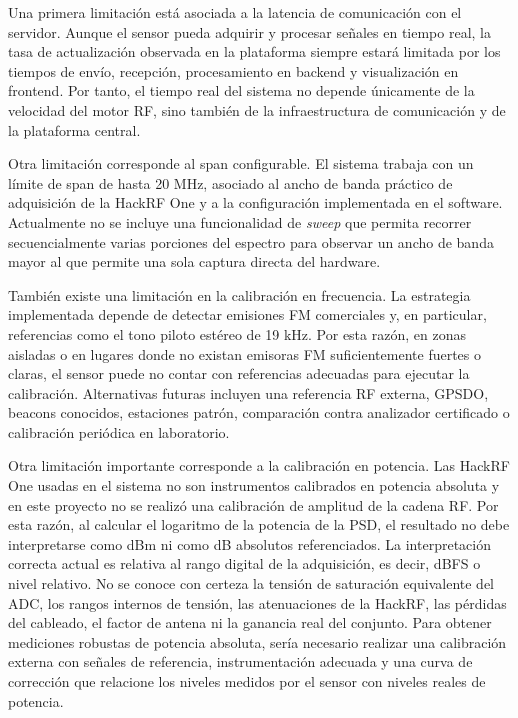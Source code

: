 Una primera limitación está asociada a la latencia de comunicación con el servidor.
Aunque el sensor pueda adquirir y procesar señales en tiempo real, la tasa de
actualización observada en la plataforma siempre estará limitada por los tiempos de
envío, recepción, procesamiento en backend y visualización en frontend. Por tanto,
el tiempo real del sistema no depende únicamente de la velocidad del motor RF, sino
también de la infraestructura de comunicación y de la plataforma central.

Otra limitación corresponde al span configurable. El sistema trabaja con un límite
de span de hasta 20 MHz, asociado al ancho de banda práctico de adquisición de la
HackRF One y a la configuración implementada en el software. Actualmente no se
incluye una funcionalidad de \textit{sweep} que permita recorrer secuencialmente
varias porciones del espectro para observar un ancho de banda mayor al que permite
una sola captura directa del hardware.

También existe una limitación en la calibración en frecuencia. La estrategia
implementada depende de detectar emisiones FM comerciales y, en particular,
referencias como el tono piloto estéreo de 19 kHz. Por esta razón, en zonas
aisladas o en lugares donde no existan emisoras FM suficientemente fuertes o
claras, el sensor puede no contar con referencias adecuadas para ejecutar la
calibración. Alternativas futuras incluyen una referencia RF externa, GPSDO,
beacons conocidos, estaciones patrón, comparación contra analizador certificado o
calibración periódica en laboratorio.

Otra limitación importante corresponde a la calibración en potencia. Las HackRF
One usadas en el sistema no son instrumentos calibrados en potencia absoluta y en
este proyecto no se realizó una calibración de amplitud de la cadena RF. Por esta
razón, al calcular el logaritmo de la potencia de la PSD, el resultado no debe
interpretarse como dBm ni como dB absolutos referenciados. La interpretación
correcta actual es relativa al rango digital de la adquisición, es decir, dBFS o
nivel relativo. No se conoce con certeza la tensión de saturación equivalente del
ADC, los rangos internos de tensión, las atenuaciones de la HackRF, las pérdidas
del cableado, el factor de antena ni la ganancia real del conjunto. Para obtener
mediciones robustas de potencia absoluta, sería necesario realizar una calibración
externa con señales de referencia, instrumentación adecuada y una curva de
corrección que relacione los niveles medidos por el sensor con niveles reales de
potencia.

